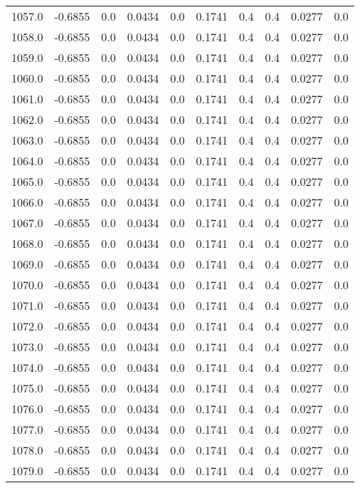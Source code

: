 \begin{longtable}{lrrrrrrrrr}
1057.0 & -0.6855 & 0.0 & 0.0434 & 0.0 & 0.1741 & 0.4 & 0.4 & 0.0277 & 0.0 \\
1058.0 & -0.6855 & 0.0 & 0.0434 & 0.0 & 0.1741 & 0.4 & 0.4 & 0.0277 & 0.0 \\
1059.0 & -0.6855 & 0.0 & 0.0434 & 0.0 & 0.1741 & 0.4 & 0.4 & 0.0277 & 0.0 \\
1060.0 & -0.6855 & 0.0 & 0.0434 & 0.0 & 0.1741 & 0.4 & 0.4 & 0.0277 & 0.0 \\
1061.0 & -0.6855 & 0.0 & 0.0434 & 0.0 & 0.1741 & 0.4 & 0.4 & 0.0277 & 0.0 \\
1062.0 & -0.6855 & 0.0 & 0.0434 & 0.0 & 0.1741 & 0.4 & 0.4 & 0.0277 & 0.0 \\
1063.0 & -0.6855 & 0.0 & 0.0434 & 0.0 & 0.1741 & 0.4 & 0.4 & 0.0277 & 0.0 \\
1064.0 & -0.6855 & 0.0 & 0.0434 & 0.0 & 0.1741 & 0.4 & 0.4 & 0.0277 & 0.0 \\
1065.0 & -0.6855 & 0.0 & 0.0434 & 0.0 & 0.1741 & 0.4 & 0.4 & 0.0277 & 0.0 \\
1066.0 & -0.6855 & 0.0 & 0.0434 & 0.0 & 0.1741 & 0.4 & 0.4 & 0.0277 & 0.0 \\
1067.0 & -0.6855 & 0.0 & 0.0434 & 0.0 & 0.1741 & 0.4 & 0.4 & 0.0277 & 0.0 \\
1068.0 & -0.6855 & 0.0 & 0.0434 & 0.0 & 0.1741 & 0.4 & 0.4 & 0.0277 & 0.0 \\
1069.0 & -0.6855 & 0.0 & 0.0434 & 0.0 & 0.1741 & 0.4 & 0.4 & 0.0277 & 0.0 \\
1070.0 & -0.6855 & 0.0 & 0.0434 & 0.0 & 0.1741 & 0.4 & 0.4 & 0.0277 & 0.0 \\
1071.0 & -0.6855 & 0.0 & 0.0434 & 0.0 & 0.1741 & 0.4 & 0.4 & 0.0277 & 0.0 \\
1072.0 & -0.6855 & 0.0 & 0.0434 & 0.0 & 0.1741 & 0.4 & 0.4 & 0.0277 & 0.0 \\
1073.0 & -0.6855 & 0.0 & 0.0434 & 0.0 & 0.1741 & 0.4 & 0.4 & 0.0277 & 0.0 \\
1074.0 & -0.6855 & 0.0 & 0.0434 & 0.0 & 0.1741 & 0.4 & 0.4 & 0.0277 & 0.0 \\
1075.0 & -0.6855 & 0.0 & 0.0434 & 0.0 & 0.1741 & 0.4 & 0.4 & 0.0277 & 0.0 \\
1076.0 & -0.6855 & 0.0 & 0.0434 & 0.0 & 0.1741 & 0.4 & 0.4 & 0.0277 & 0.0 \\
1077.0 & -0.6855 & 0.0 & 0.0434 & 0.0 & 0.1741 & 0.4 & 0.4 & 0.0277 & 0.0 \\
1078.0 & -0.6855 & 0.0 & 0.0434 & 0.0 & 0.1741 & 0.4 & 0.4 & 0.0277 & 0.0 \\
1079.0 & -0.6855 & 0.0 & 0.0434 & 0.0 & 0.1741 & 0.4 & 0.4 & 0.0277 & 0.0 \\

\end{longtable}
